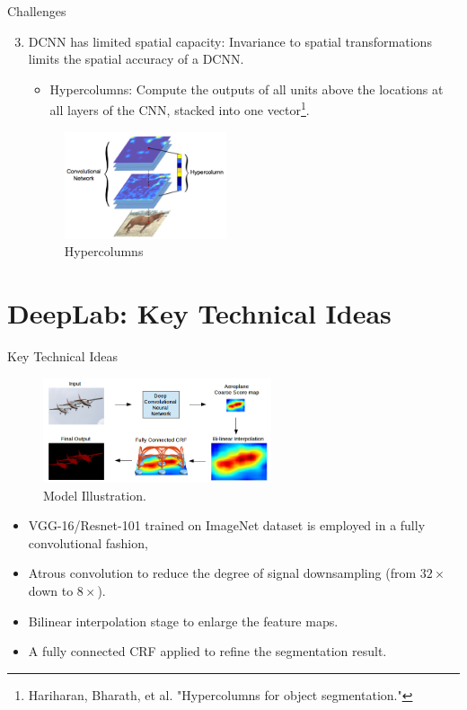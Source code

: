\documentclass{beamer}
\begin{document}
\begin{frame}{Challenges}
\begin{enumerate}
	\setcounter{enumi}{2}
	\item {\color{blue}DCNN has limited {\color{blue}spatial capacity}}:  Invariance to spatial transformations limits the spatial accuracy of a DCNN.
	\begin{itemize}
		\item Hypercolumns: Compute the outputs of all units above the locations at all layers of the CNN, stacked into one vector\footnote{Hariharan, Bharath, et al. "Hypercolumns for object segmentation."}.
	\end{itemize}	
	\begin{figure}
		\centering
		\includegraphics[width=0.45\textwidth]{figure/ss20.png}
		\captionsetup{justification=centering}
		\caption{Hypercolumns}	
	\end{figure}
\end{enumerate}
\end{frame}

\section{DeepLab: Key Technical Ideas}

\begin{frame}{Key Technical Ideas}
\begin{figure}
	\centering
	\includegraphics[width=0.6\textwidth]{figure/ss18.png}
	\captionsetup{justification=centering}
	\caption{Model Illustration.}	
\end{figure}
\vspace{-0.4cm}
	\begin{itemize}
	\item VGG-16/Resnet-101 trained on ImageNet dataset is employed in a {\color{blue}fully convolutional} fashion,
	\item<2-> Atrous convolution to reduce the degree of signal downsampling (from $32\times$ down to $8\times$).
	\item<3-> {\color{blue}Bilinear interpolation} stage to enlarge the feature maps.
	\item<4-> A fully connected CRF applied to refine the segmentation result.
\end{itemize}	
\end{frame}
\end{document}
